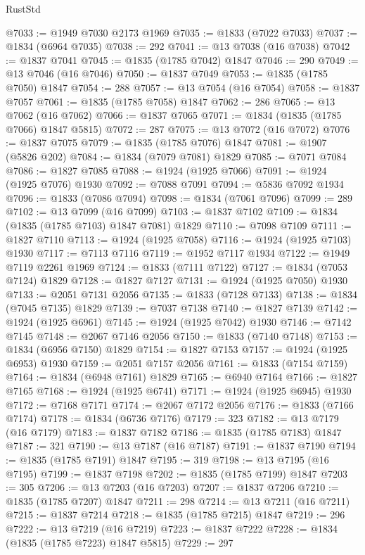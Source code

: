 \begin{lexlean}{RustStd}
\begin{coremodule}
@7033 := @1949 @7030 @2173 @1969
@7035 := @1833 (@7022 @7033)
@7037 := @1834 (@6964 @7035)
@7038 := 292
@7041 := @13 @7038 (@16 @7038)
@7042 := @1837 @7041
@7045 := @1835 (@1785 @7042) @1847
@7046 := 290
@7049 := @13 @7046 (@16 @7046)
@7050 := @1837 @7049
@7053 := @1835 (@1785 @7050) @1847
@7054 := 288
@7057 := @13 @7054 (@16 @7054)
@7058 := @1837 @7057
@7061 := @1835 (@1785 @7058) @1847
@7062 := 286
@7065 := @13 @7062 (@16 @7062)
@7066 := @1837 @7065
@7071 := @1834 (@1835 (@1785 @7066) @1847 @5815)
@7072 := 287
@7075 := @13 @7072 (@16 @7072)
@7076 := @1837 @7075
@7079 := @1835 (@1785 @7076) @1847
@7081 := @1907 (@5826 @202)
@7084 := @1834 (@7079 @7081) @1829
@7085 := @7071 @7084
@7086 := @1827 @7085
@7088 := @1924 (@1925 @7066)
@7091 := @1924 (@1925 @7076) @1930
@7092 := @7088 @7091
@7094 := @5836 @7092 @1934
@7096 := @1833 (@7086 @7094)
@7098 := @1834 (@7061 @7096)
@7099 := 289
@7102 := @13 @7099 (@16 @7099)
@7103 := @1837 @7102
@7109 := @1834 (@1835 (@1785 @7103) @1847 @7081) @1829
@7110 := @7098 @7109
@7111 := @1827 @7110
@7113 := @1924 (@1925 @7058)
@7116 := @1924 (@1925 @7103) @1930
@7117 := @7113 @7116
@7119 := @1952 @7117 @1934
@7122 := @1949 @7119 @2261 @1969
@7124 := @1833 (@7111 @7122)
@7127 := @1834 (@7053 @7124) @1829
@7128 := @1827 @7127
@7131 := @1924 (@1925 @7050) @1930
@7133 := @2051 @7131 @2056
@7135 := @1833 (@7128 @7133)
@7138 := @1834 (@7045 @7135) @1829
@7139 := @7037 @7138
@7140 := @1827 @7139
@7142 := @1924 (@1925 @6961)
@7145 := @1924 (@1925 @7042) @1930
@7146 := @7142 @7145
@7148 := @2067 @7146 @2056
@7150 := @1833 (@7140 @7148)
@7153 := @1834 (@6956 @7150) @1829
@7154 := @1827 @7153
@7157 := @1924 (@1925 @6953) @1930
@7159 := @2051 @7157 @2056
@7161 := @1833 (@7154 @7159)
@7164 := @1834 (@6948 @7161) @1829
@7165 := @6940 @7164
@7166 := @1827 @7165
@7168 := @1924 (@1925 @6741)
@7171 := @1924 (@1925 @6945) @1930
@7172 := @7168 @7171
@7174 := @2067 @7172 @2056
@7176 := @1833 (@7166 @7174)
@7178 := @1834 (@6736 @7176)
@7179 := 323
@7182 := @13 @7179 (@16 @7179)
@7183 := @1837 @7182
@7186 := @1835 (@1785 @7183) @1847
@7187 := 321
@7190 := @13 @7187 (@16 @7187)
@7191 := @1837 @7190
@7194 := @1835 (@1785 @7191) @1847
@7195 := 319
@7198 := @13 @7195 (@16 @7195)
@7199 := @1837 @7198
@7202 := @1835 (@1785 @7199) @1847
@7203 := 305
@7206 := @13 @7203 (@16 @7203)
@7207 := @1837 @7206
@7210 := @1835 (@1785 @7207) @1847
@7211 := 298
@7214 := @13 @7211 (@16 @7211)
@7215 := @1837 @7214
@7218 := @1835 (@1785 @7215) @1847
@7219 := 296
@7222 := @13 @7219 (@16 @7219)
@7223 := @1837 @7222
@7228 := @1834 (@1835 (@1785 @7223) @1847 @5815)
@7229 := 297

\end{coremodule}
\end{lexlean}
